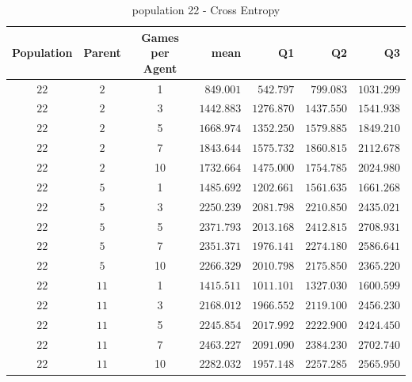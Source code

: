 \begin{table}[H]
\centering
\small
\begin{tabular}{c c c r r r r}
Population & Parent & Games per Agent & mean & Q1 & Q2 & Q3\\
\hline
$22$ & $2$ & 1 & $849.001$ & $542.797$ & $799.083$ & $1031.299$\\
$22$ & $2$ & 3 & $1442.883$ & $1276.870$ & $1437.550$ & $1541.938$\\
$22$ & $2$ & 5 & $1668.974$ & $1352.250$ & $1579.885$ & $1849.210$\\
\hdashline
$22$ & $2$ & 7 & $1843.644$ & $1575.732$ & $1860.815$ & $2112.678$\\
\hdashline
$22$ & $2$ & 10 & $1732.664$ & $1475.000$ & $1754.785$ & $2024.980$\\
$22$ & $5$ & 1 & $1485.692$ & $1202.661$ & $1561.635$ & $1661.268$\\
$22$ & $5$ & 3 & $2250.239$ & $2081.798$ & $2210.850$ & $2435.021$\\
\hdashline
$22$ & $5$ & 5 & $2371.793$ & $2013.168$ & $2412.815$ & $2708.931$\\
\hdashline
$22$ & $5$ & 7 & $2351.371$ & $1976.141$ & $2274.180$ & $2586.641$\\
$22$ & $5$ & 10 & $2266.329$ & $2010.798$ & $2175.850$ & $2365.220$\\
$22$ & $11$ & 1 & $1415.511$ & $1011.101$ & $1327.030$ & $1600.599$\\
$22$ & $11$ & 3 & $2168.012$ & $1966.552$ & $2119.100$ & $2456.230$\\
$22$ & $11$ & 5 & $2245.854$ & $2017.992$ & $2222.900$ & $2424.450$\\
\hdashline
$22$ & $11$ & 7 & $2463.227$ & $2091.090$ & $2384.230$ & $2702.740$\\
\hdashline
$22$ & $11$ & 10 & $2282.032$ & $1957.148$ & $2257.285$ & $2565.950$\\
\end{tabular}
\caption{population 22 - Cross Entropy}
\end{table}


